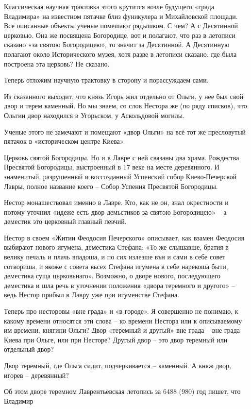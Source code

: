 Классическая научная трактовка этого крутится возле будущего «града Владимира» на известном пятачке близ фуникулера и Михайловской площади. Все описанные объекты ученые помешают рядышком. С чем? А с Десятинной церковью. Она же посвящена Богородице, вот и полагают, что раз в летописи сказано «за святою Богородицею», то значит за Десятинной. А Десятинную полагают около Исторического музея, хотя разве в летописи сказано, где была построена эта церковь? Не сказано.

Теперь отложим научную трактовку в сторону и порассуждаем сами.

Из сказанного выходит, что князь Игорь жил отдельно от Ольги, у нее был свой двор и терем каменный. Но мы знаем, со слов Нестора же (по ряду списков), что Ольгин двор находился в Угорьском, у Аскольдовой могилы.

Ученые этого не замечают и помещают «двор Ольги» на всё тот же пресловутый пятачок в «историческом центре Киева».

Церковь святой Богородицы. Но и в Лавре с ней связаны два храма. Рождества Пресвятой Богородицы, выстроенный в 17 веке на месте деревянного. И знаменитый, разрушенный и воссозданный Успенский собор Киево-Печерской Лавры, полное название коего – Собор Успения Пресвятой Богородицы.

Нестор монашествовал именно в Лавре. Кто, как не он, знал окрестности и потому уточнил «идеже есть двор демьстиков за святою Богородицею» – а деместик это церковный главный певчий.

Нестор в своем «Житии Феодосия Печерского» описывает, как взамен Феодосия выбирают нового игумена, деместика Стефана: «То же слышавше, братия в велику печаль и плачь впадоша, и по сих излезше вън и сами в себе совет сотвориша, и якоже с совета вьсех Стефана игумена в себе нарекоша быти, деместика суща цьрковьнаго». Возможно, о дворе нового, последующего деместика и шла речь в уточнении положения «двора теремного и другого» – ведь Нестор прибыл в Лавру уже при игуменстве Стефана.

Теперь про несторовы «вне града» и «в городе». Я совершенно не понимаю, к какому времени относятся эти слова – ко времени Нестора или к описываемому им времени, княгини Ольги? Двор «теремный и другый» вне града – вне града Киева при Ольге, или при Несторе? Другый двор – это двор теремный или отдельный двор?

Двор теремный, где Ольга сидит, подчеркивается – каменный. А княж двор, игорев – деревянный?

Об этом дворе теремном Лаврентьевская летопись за 6488 (980) год пишет, что Владимир 

